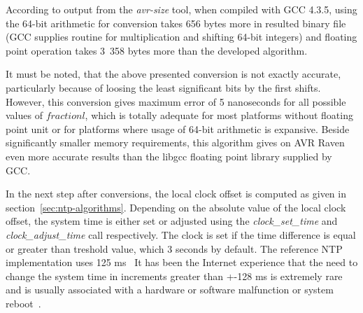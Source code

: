 According to output from the {\it{avr-size}} tool,
when compiled with GCC 4.3.5,
using the 64-bit arithmetic for conversion
takes 656 bytes more in %
resulted binary file (GCC supplies routine for multiplication and shifting 64-bit integers)
and floating point operation takes 3~358 bytes more
than the developed algorithm.

It must be noted, that the above presented conversion is not exactly accurate, particularly
because of loosing the least significant bits by the first shifts.
However, this conversion gives maximum error of 5 nanoseconds for all possible values of $fractionl$,
which is totally adequate for most platforms without floating point unit or
for platforms where usage of 64-bit arithmetic is expansive.
Beside significantly smaller memory requirements,
this algorithm gives on AVR Raven even more accurate results than the libgcc
floating point library supplied by GCC.


In the next step after conversions, the local clock offset is computed
as given in section~\ref{sec:ntp-algorithms}.
Depending on the absolute value of the local clock offset,
the system time is either set or adjusted using the {\it{clock\_set\_time}}
and {\it{clock\_adjust\_time}} call respectively.
The clock is set if the time difference is equal or greater than
treshold value, which 3 seconds by default. %
The reference NTP implementation uses 125 ms~\cite{rfc5905}
It has been the Internet
experience that the need to change the system time in increments
greater than +-128 ms is extremely rare and is usually associated
with a hardware or software malfunction or system reboot~\cite{rfc1589}.


%
%

